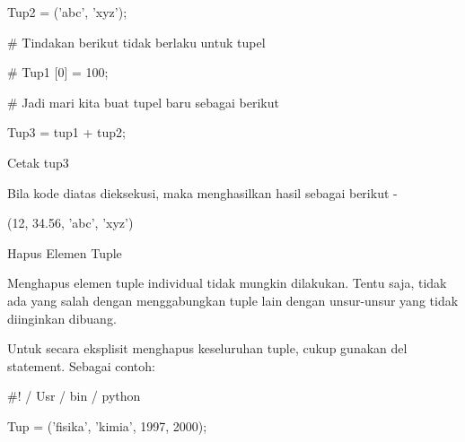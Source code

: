 \documentclass[a4paper,12pt]{report}
\begin{document}
\noindent 
{\fontsize{14pt}{14pt}\selectfont Tup2 = ('abc', 'xyz'); \\} \par
\vspace{14pt}
\noindent 
{\fontsize{14pt}{14pt}\selectfont  $  \#  $ Tindakan berikut tidak berlaku untuk tupel \\} \par
\noindent 
{\fontsize{14pt}{14pt}\selectfont  $  \#  $ Tup1 [0] = 100; \\} \par
\vspace{14pt}
\noindent 
{\fontsize{14pt}{14pt}\selectfont  $  \#  $ Jadi mari kita buat tupel baru sebagai berikut \\} \par
\noindent 
{\fontsize{14pt}{14pt}\selectfont Tup3 = tup1 + tup2; \\} \par
\noindent 
{\fontsize{14pt}{14pt}\selectfont Cetak tup3 \\} \par
\noindent 
{\fontsize{14pt}{14pt}\selectfont Bila kode diatas dieksekusi, maka menghasilkan hasil sebagai berikut - \\} \par
\noindent 
{\fontsize{14pt}{14pt}\selectfont (12, 34.56, 'abc', 'xyz') \\} \par
\noindent 
{\fontsize{14pt}{14pt}\selectfont Hapus Elemen Tuple \\} \par
\noindent 
{\fontsize{14pt}{14pt}\selectfont Menghapus elemen tuple individual tidak mungkin dilakukan. Tentu saja, tidak ada yang salah dengan menggabungkan tuple lain dengan unsur-unsur yang tidak diinginkan dibuang. \\} \par
\noindent 
{\fontsize{14pt}{14pt}\selectfont Untuk secara eksplisit menghapus keseluruhan tuple, cukup gunakan del statement. Sebagai contoh: \\} \par
\noindent 
{\fontsize{14pt}{14pt}\selectfont  $  \#  $! / Usr / bin / python \\} \par
\vspace{14pt}
\noindent 
{\fontsize{14pt}{14pt}\selectfont Tup = ('fisika', 'kimia', 1997, 2000); \\} \par
\vspace{14pt}
\end{document}
